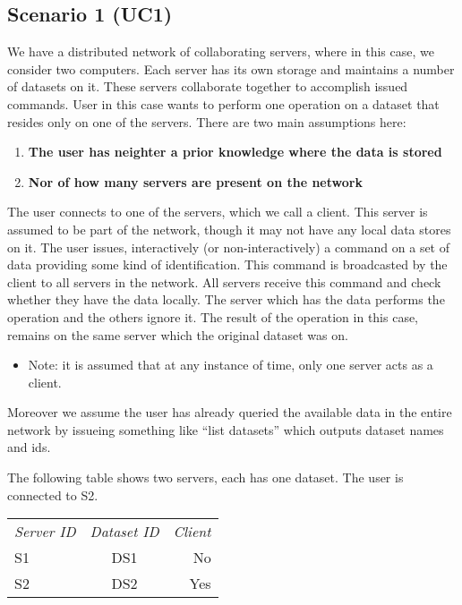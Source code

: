 \subsection{Scenario 1 (UC1)}
We have a distributed network of collaborating servers, where in this case, we consider two computers. 
Each server has its own storage and maintains a number of datasets on it. These servers collaborate 
together to accomplish issued commands. User in this case wants to perform one operation on a dataset
that resides only on one of the servers. There are two main assumptions here:
\begin{enumerate}
\item \textbf{The user has neighter a prior knowledge where the data is stored}
\item \textbf{Nor of how many servers are present on the network}
\end{enumerate}

The user connects to one of the servers, which we call a client. This server is assumed to be part 
of the network, though it may not have any local data stores on it. The user issues, interactively
(or non-interactively) a command on a set of data providing some kind of identification. This command
is broadcasted by the client to all servers in the network. All servers receive this command and check
whether they have the data locally. The server which has the data performs the operation and the others
ignore it. The result of the operation in this case, remains on the same server which the original 
dataset was on. 

\begin{itemize}
\item Note: it is assumed that at any instance of time, only one server acts as a client.
\end{itemize}

Moreover we assume the user has already queried the available data in the entire network by 
issueing something like “list datasets” which outputs dataset names and ids.

The following table shows two servers, each has one dataset. The user is connected to S2.\\

\begin{tabular}{ l c r }
\em{Server ID} & \em{ Dataset ID} & \em{ Client} \\
S1 & DS1 & No \\
S2 & DS2 & Yes \\
\end{tabular}\\

